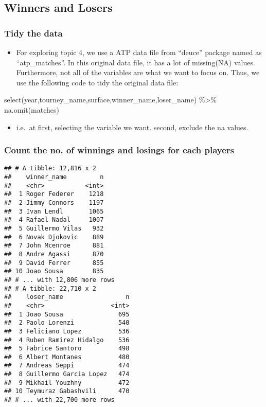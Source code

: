 \documentclass[]{article}
\providecommand{\tightlist}{%
  \setlength{\itemsep}{0pt}\setlength{\parskip}{0pt}}
\begin{document}
\subsection{Winners and Losers}\label{winners-and-losers}

\subsubsection{Tidy the data}\label{tidy-the-data}

\begin{itemize}
\tightlist
\item
  For exploring topic 4, we use a ATP data file from ``deuce'' package
  named as ``atp\_matches''. In this original data file, it has a lot of
  missing(NA) values. Furthermore, not all of the variables are what we
  want to focus on. Thus, we use the following code to tidy the original
  data file:
\end{itemize}

select(year,tourney\_name,surface,winner\_name,loser\_name)
\%\textgreater{}\% na.omit(matches)

\begin{itemize}
\tightlist
\item
  i.e.~at first, selecting the variable we want. second, exclude the na
  values.
\end{itemize}

\subsubsection{Count the no. of winnings and losings for each
players}\label{count-the-no.-of-winnings-and-losings-for-each-players}

\begin{verbatim}
## # A tibble: 12,816 x 2
##    winner_name         n
##    <chr>           <int>
##  1 Roger Federer    1218
##  2 Jimmy Connors    1197
##  3 Ivan Lendl       1065
##  4 Rafael Nadal     1007
##  5 Guillermo Vilas   932
##  6 Novak Djokovic    889
##  7 John Mcenroe      881
##  8 Andre Agassi      870
##  9 David Ferrer      855
## 10 Joao Sousa        835
## # ... with 12,806 more rows
## # A tibble: 22,710 x 2
##    loser_name                 n
##    <chr>                  <int>
##  1 Joao Sousa               695
##  2 Paolo Lorenzi            540
##  3 Feliciano Lopez          536
##  4 Ruben Ramirez Hidalgo    536
##  5 Fabrice Santoro          498
##  6 Albert Montanes          480
##  7 Andreas Seppi            474
##  8 Guillermo Garcia Lopez   474
##  9 Mikhail Youzhny          472
## 10 Teymuraz Gabashvili      470
## # ... with 22,700 more rows
\end{verbatim}
\end{document}

